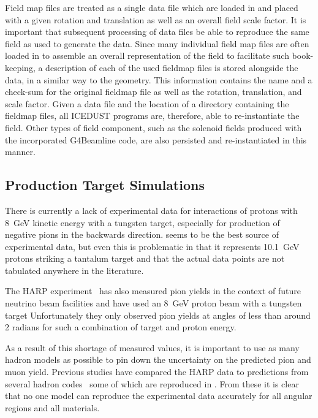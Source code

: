 Field map files are treated as a single data file which are loaded in and placed with a given rotation and translation as well as an overall field scale factor.
It is important that subsequent processing of data files be able to reproduce the same field as used to generate the data.
Since many individual field map files are often loaded in to assemble an overall representation of the field to facilitate such book-keeping, a description of each of the used fieldmap files is stored alongside the data, in a similar way to the geometry.
This information contains the name and a check-sum for the original fieldmap file as well as the rotation, translation, and scale factor.
Given a data file and the location of a directory containing the fieldmap files, all ICEDUST programs are, therefore, able to re-instantiate the field.
Other types of field component, such as the solenoid fields produced with the incorporated G4Beamline code, are also persisted and re-instantiated in this manner.

\subsection{Production Target Simulations}
\FigPiYieldHadronCodes
There is currently a lack of experimental data for interactions of protons with 8~GeV kinetic energy with a tungsten target, especially for production of negative pions in the backwards direction.
 seems to be the best source of experimental data, but even this is problematic in that it represents 10.1~GeV protons striking a tantalum target and that the actual data points are not tabulated anywhere in the literature.

The HARP experiment~\cite{HARP2007} has also measured pion yields in the context of future neutrino beam facilities and have used an 8~GeV proton beam with a tungsten target
Unfortunately they only observed pion yields at angles of less than around 2 radians for such a combination of target and proton energy.

As a result of this shortage of measured values, it is important to use as many hadron models as possible to pin down the uncertainty on the predicted pion and muon yield.
Previous studies have compared the HARP data to predictions from several hadron codes~\cite{AEdmondsThesis,YeYangPrivate} some of which are reproduced in .
From these it is clear that no one model can reproduce the experimental data accurately for all angular regions and all materials.

